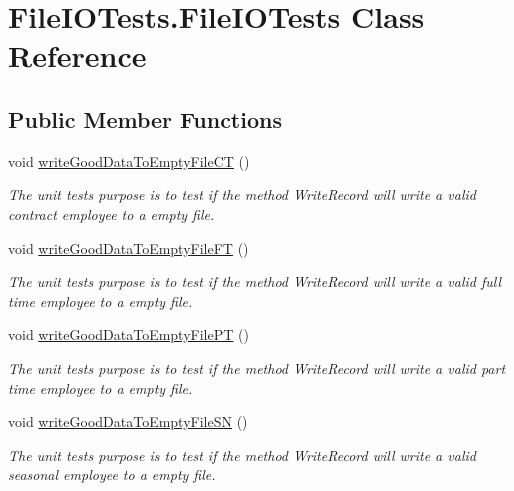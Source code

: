 \hypertarget{class_file_i_o_tests_1_1_file_i_o_tests}{}\section{File\+I\+O\+Tests.\+File\+I\+O\+Tests Class Reference}
\label{class_file_i_o_tests_1_1_file_i_o_tests}
\subsection*{Public Member Functions}
\begin{DoxyCompactItemize}
\item 
void \hyperlink{class_file_i_o_tests_1_1_file_i_o_tests_a5576e74011efb2c59ee879ff52d6adab}{write\+Good\+Data\+To\+Empty\+File\+C\+T} ()
\begin{DoxyCompactList}\small\item\em The unit test\textquotesingle{}s purpose is to test if the method Write\+Record will write a valid contract employee to a empty file. \end{DoxyCompactList}\item 
void \hyperlink{class_file_i_o_tests_1_1_file_i_o_tests_a26f35013ab03e8e1b781b73824fae84e}{write\+Good\+Data\+To\+Empty\+File\+F\+T} ()
\begin{DoxyCompactList}\small\item\em The unit test\textquotesingle{}s purpose is to test if the method Write\+Record will write a valid full time employee to a empty file. \end{DoxyCompactList}\item 
void \hyperlink{class_file_i_o_tests_1_1_file_i_o_tests_af4f229c45a4170ea087d7791d942f1bc}{write\+Good\+Data\+To\+Empty\+File\+P\+T} ()
\begin{DoxyCompactList}\small\item\em The unit test\textquotesingle{}s purpose is to test if the method Write\+Record will write a valid part time employee to a empty file. \end{DoxyCompactList}\item 
void \hyperlink{class_file_i_o_tests_1_1_file_i_o_tests_af51dab6545c7cc79a53c059a23b121f5}{write\+Good\+Data\+To\+Empty\+File\+S\+N} ()
\begin{DoxyCompactList}\small\item\em The unit test\textquotesingle{}s purpose is to test if the method Write\+Record will write a valid seasonal employee to a empty file. \end{DoxyCompactList}\item 

\end{DoxyCompactItemize}
